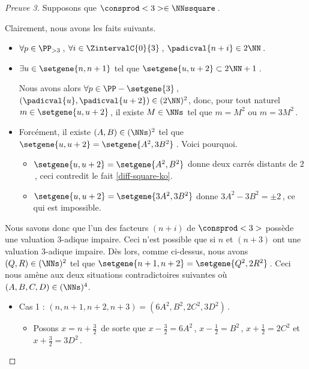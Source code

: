 	
\begin{proof}[Preuve 3]
    Supposons que $\consprod<3> \in \NNssquare$\,.
    
    \smallskip
    
	Clairement, nous avons les faits suivants.
    \begin{itemize}
    	\item  
		$\forall p \in \PP_{>3}$\,, 
   		$\forall i \in \ZintervalC{0}{3}$\,, 
    	$\padicval{n + i} \in 2 \NN$\,.
	
	
		\item $\exists u \in \setgene{n, n+1}$ tel que $\setgene{u, u + 2} \subset 2 \NN + 1$\,.
		
		\noindent
		Nous avons alors
		$\forall p \in \PP - \setgene{3}$\,, 
   		$(\padicval{u}, \padicval{u+2}) \in ( 2 \NN )^2$,
		donc, pour tout naturel $m \in \setgene{u, u + 2}$\,, 
		il existe $M \in \NNs$ tel que 
		$m = M^2$ ou $m = 3 M^2$\,.
	
	
		\item Forcément, il existe $(A, B) \in ( \NNs )^2$ tel que 
        $\setgene{u, u + 2} = \setgene{A^2, 3 B^2}$\,. Voici pourquoi.
        \begin{itemize}
        	\item $\setgene{u, u + 2} = \setgene{A^2, B^2}$ donne deux carrés distants de $2$\,, ceci contredit le fait \ref{diff-square-ko}.

        	\item $\setgene{u, u + 2} = \setgene{3 A^2, 3 B^2}$ donne $3 A^2 - 3 B^2 = \pm 2$\,, ce qui est impossible.
        \end{itemize}
    \end{itemize}

    \smallskip
	
	Nous savons donc que l'un des facteurs $(n+i)$ de $\consprod<3>$ possède une valuation $3$-adique impaire. Ceci n'est possible que si $n$ et $(n+3)$ ont une valuation $3$-adique impaire.
	Dès lors, comme ci-dessus, nous avons $(Q, R) \in ( \NNs )^2$ tel que $\setgene{n+1, n+2} = \setgene{Q^2, 2 R^2}$\,.
	Ceci nous amène aux deux situations contradictoires suivantes où $(A, B, C, D) \in ( \NNs )^4$.
	
    \begin{itemize}
    	\item Cas 1 : $(n, n+1, n+2, n+3) = (6A^2, B^2, 2C^2, 3D^2)$\,.
		\begin{itemize}
        	\item Posons $x = n + \frac32$\, de sorte que 
        	$x - \frac32 = 6 A^2$\,, $x - \frac12 = B^2$\,, $x + \frac12 = 2 C^2$ et $x + \frac32 = 3 D^2$\,.
        

\end{itemize}
\end{itemize}
\end{proof}
